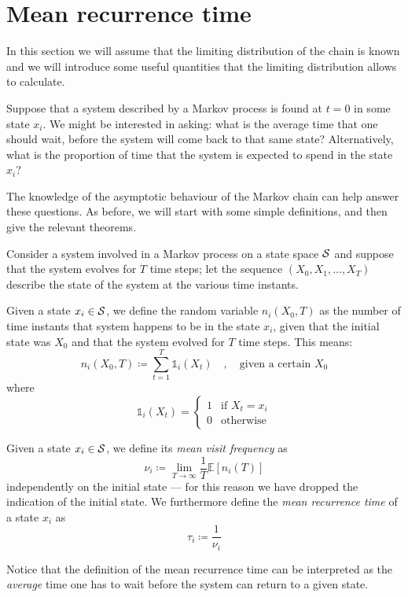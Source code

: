 \section{Mean recurrence time}
In this section we will assume that the limiting distribution of the chain is known and we will introduce some useful quantities that the limiting distribution allows to calculate.

Suppose that a system described by a Markov process is found at $t = 0$ in some state $x_i$. We might be interested in asking: what is the average time that one should wait, before the system will come back to that same state? Alternatively, what is the proportion of time that the system is expected to spend in the state $x_i$?

The knowledge of the asymptotic behaviour of the Markov chain can help answer these questions. As before, we will start with some simple definitions, and then give the relevant theorems.

\medskip
Consider a system involved in a Markov process on a state space $\mathcal{S}$ and suppose that the system evolves for $T$ time steps; let the sequence $(X_0, X_1, \dots, X_T)$ describe the state of the system at the various time instants.
\begin{ndef} 
    Given a state $x_i \in \mathcal{S}$, we define the random variable $n_i (X_0, T)$ as the number of time instants that system happens to be in the state $x_i$, given that the initial state was $X_0$ and that the system evolved for $T$ time steps. This means:
    \begin{equation}
        n_i (X_0, T) \coloneqq \sum_{t = 1}^T \mathds{1}_i(X_t) \quad , \quad \text{given a certain }X_0
    \end{equation}
    where
    \begin{equation}
        \mathds{1}_i(X_t) =
        \begin{cases}
            1 & \text{if $X_t = x_i$} \\
            0 & \text{otherwise}
        \end{cases}
    \end{equation}
\end{ndef}
\begin{ndef}  \label{def:nu-tau}
    Given a state $x_i \in \mathcal{S}$, we define its \emph{mean visit frequency} as
    \begin{equation}
        \nu_i \coloneqq \lim_{T\rightarrow \infty} \frac{1}{T} \mathds{E} \left[ n_i (T) \right]
    \end{equation}
    independently on the initial state --- for this reason we have dropped the indication of the initial state.
    We furthermore define the \emph{mean recurrence time} of a state $x_i$ as
    \begin{equation} \label{def:mean_rec_time}
        \tau_i \coloneqq \frac{1}{\nu_i}
    \end{equation}
\end{ndef}
Notice that the definition of the mean recurrence time can be interpreted as the \emph{average} time one has to wait before the system can return to a given state.

